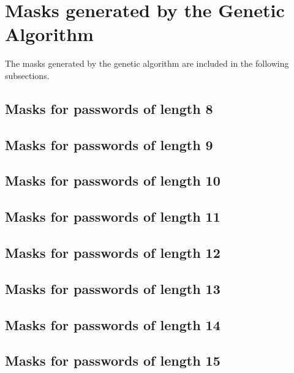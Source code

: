 \documentclass[sigconf,authordraft]{acmart}
\begin{document}



\appendix

\section{Masks generated by the Genetic Algorithm}

The masks generated by the genetic algorithm are included in the following subsections.

\subsection{Masks for passwords of length 8}


\subsection{Masks for passwords of length 9}


\subsection{Masks for passwords of length 10}


\subsection{Masks for passwords of length 11}


\subsection{Masks for passwords of length 12}


\subsection{Masks for passwords of length 13}


\subsection{Masks for passwords of length 14}


\subsection{Masks for passwords of length 15}

\end{document}
